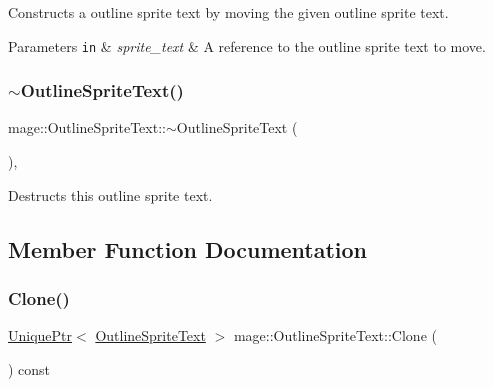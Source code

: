 Constructs a outline sprite text by moving the given outline sprite text.


\begin{DoxyParams}[1]{Parameters}
\mbox{\tt in}  & {\em sprite\+\_\+text} & A reference to the outline sprite text to move. \\
\hline
\end{DoxyParams}
\hypertarget{classmage_1_1_outline_sprite_text_ae4d77ebb3f5bac4fd02b148d6173d10f}{}\label{classmage_1_1_outline_sprite_text_ae4d77ebb3f5bac4fd02b148d6173d10f} 
\subsubsection{\texorpdfstring{$\sim$\+Outline\+Sprite\+Text()}{~OutlineSpriteText()}}
{\footnotesize\ttfamily mage\+::\+Outline\+Sprite\+Text\+::$\sim$\+Outline\+Sprite\+Text (\begin{DoxyParamCaption}{ }\end{DoxyParamCaption})\hspace{0.3cm}{\ttfamily [virtual]}, {\ttfamily [default]}}

Destructs this outline sprite text. 

\subsection{Member Function Documentation}
\hypertarget{classmage_1_1_outline_sprite_text_aa188cb104f6f00fdc75c532d66869f02}{}\label{classmage_1_1_outline_sprite_text_aa188cb104f6f00fdc75c532d66869f02} 
\subsubsection{\texorpdfstring{Clone()}{Clone()}}
{\footnotesize\ttfamily \hyperlink{namespacemage_a3316d7143a973e37adf1110f2e80ca31}{Unique\+Ptr}$<$ \hyperlink{classmage_1_1_outline_sprite_text}{Outline\+Sprite\+Text} $>$ mage\+::\+Outline\+Sprite\+Text\+::\+Clone (\begin{DoxyParamCaption}{ }\end{DoxyParamCaption}) const}

